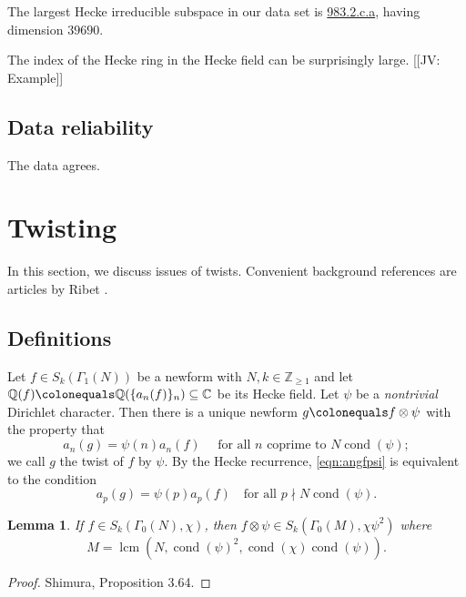 \documentclass[11pt]{amsart}
\numberwithin{equation}{subsection}
\theoremstyle{plain}
\newtheorem{lem}[equation]{Lemma}
\theoremstyle{definition}
\newcommand{\Q}{\mathbb{Q}}
\newcommand{\Z}{\mathbb{Z}}
\newcommand{\C}{\mathbb{C}}
\newcommand{\defi}[1]{\textsf{#1}} 	%
\DeclareMathOperator{\cond}{cond}
\DeclareMathOperator{\lcm}{lcm}
\newcommand{\jv}[1]{{\color{red} \textsf{[[JV: #1]]}}}
\begin{document}
The largest Hecke irreducible subspace in our data set is \href{http://cmfs.lmfdb.xyz/ModularForm/GL2/Q/holomorphic/983/2/c/a/}{\textsf{983.2.c.a}}, having dimension $39690$.

The index of the Hecke ring in the Hecke field can be surprisingly large.  \jv{Example}

\subsection{Data reliability}

The data agrees.

\section{Twisting}

In this section, we discuss issues of twists.  Convenient background references are articles by Ribet \cite{Ribet:galreps,Ribet:endos}.

\subsection{Definitions}

Let $f \in S_k(\Gamma_1(N))$ be a newform with $N,k \in \Z_{\geq 1}$ and let $\Q(f) \colonequals \Q(\{a_n(f)\}_n) \subseteq \C$ be its Hecke field.  Let $\psi$ be a \emph{nontrivial} Dirichlet character.  Then there is a unique newform $g \colonequals f \otimes \psi$ with the property that 
\begin{equation} \label{eqn:angfpsi}
a_n(g)=\psi(n)a_n(f) \quad \text{ for all $n$ coprime to $N\cond(\psi)$};
\end{equation}
we call $g$ the \defi{twist} of $f$ by $\psi$.  By the Hecke recurrence, \eqref{eqn:angfpsi} is equivalent to the condition 
\begin{equation}
a_p(g)=\psi(p)a_p(f) \quad \text{for all $p \nmid N\cond(\psi)$.}
\end{equation}

\begin{lem} \label{lem:MNchipsi}
If $f \in S_k(\Gamma_0(N),\chi)$, then $f \otimes \psi \in S_k(\Gamma_0(M),\chi\psi^2)$ where
\begin{equation} \label{eqn:MNpsi}
M = \lcm(N,\cond(\psi)^2,\cond(\chi)\cond(\psi)). 
\end{equation}
\end{lem}

\begin{proof}
Shimura, Proposition 3.64.
\end{proof}
\end{document}
